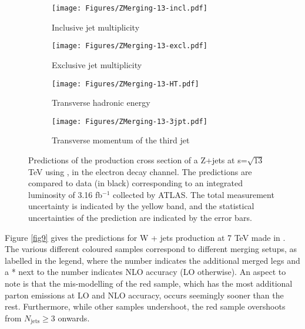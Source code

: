 \begin{figure}[ht] 
  \begin{subfigure}[b]{0.5\linewidth}
    \centering
    \texttt{[image: Figures/ZMerging-13-incl.pdf]} 
    \caption{Inclusive jet multiplicity} 
    \label{fig7:a} 
    \vspace{4ex}
  \end{subfigure}%
  \begin{subfigure}[b]{0.5\linewidth}
    \centering
    \texttt{[image: Figures/ZMerging-13-excl.pdf]}
    \caption{Exclusive jet multiplicity} 
    \label{fig7:b} 
    \vspace{4ex}
  \end{subfigure} 
  \begin{subfigure}[b]{0.5\linewidth}
    \centering
    \texttt{[image: Figures/ZMerging-13-HT.pdf]}
    \caption{Transverse hadronic energy} 
    \label{fig7:c} 
  \end{subfigure}%
  \begin{subfigure}[b]{0.5\linewidth}
    \centering
    \texttt{[image: Figures/ZMerging-13-3jpt.pdf]}
    \caption{Transverse momentum of the third jet} 
    \label{fig7:d} 
  \end{subfigure} 
  \caption{Predictions of the production cross section of a Z+jets at s=$\sqrt{13}$ TeV using , in the electron decay channel. The predictions are compared to data (in black) corresponding to an integrated luminosity of 3.16 fb$^{-1}$ collected by ATLAS. The total measurement uncertainty is indicated by the yellow band, and the statistical uncertainties of the prediction are indicated by the error bars.}
  \label{fig7} 
\end{figure}

Figure \ref{fig9} gives the predictions for W + jets production at 7 TeV made in . The various different coloured samples correspond to different merging setups, as labelled in the legend, where the number indicates the additional merged legs and a * next to the number indicates NLO accuracy (LO otherwise). An aspect to note is that the mis-modelling of the red sample, which has the most additional parton emissions at LO and NLO accuracy, occurs seemingly sooner than the rest. Furthermore, while other samples undershoot, the red sample overshoots from $N_{\text{jets}}\geq3$ onwards. 

